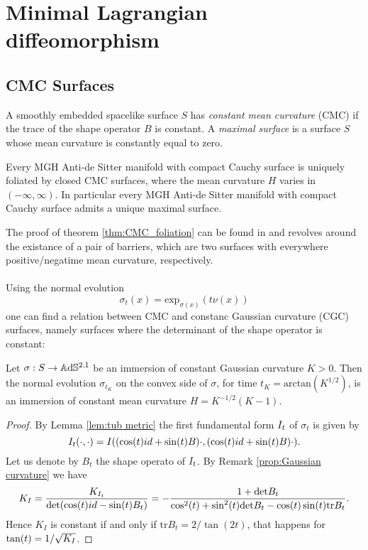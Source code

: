 \chapter{Minimal Lagrangian diffeomorphism}



\section{CMC Surfaces}
A smoothly embedded spacelike surface $S$ has \textit{constant mean curvature} (CMC) if the trace of the shape operator $B$ is constant. A \textit{maximal surface} is a surface $S$ whose mean curvature is constantly equal to zero.
\begin{theorem}\label{thm:CMC_foliation}
    Every MGH Anti-de Sitter manifold with compact Cauchy surface is uniquely foliated by closed CMC surfaces, where the mean curvature $H$ varies in $(-\infty,\infty)$. In particular every MGH Anti-de Sitter manifold with compact Cauchy surface admits a unique maximal surface.
\end{theorem}
The proof of theorem \ref{thm:CMC_foliation} can be found in \cite{barbot2004constant} and revolves around the existance of a pair of barriers, which are two surfaces with everywhere positive/negatime mean curvature, respectively.\\
\\
Using the normal evolution
\[
    \sigma_t(x) = \text{exp}_{\sigma(x)} (t\nu(x))
\]
one can find a relation between CMC and constanc Gaussian curvature (CGC) surfaces, namely surfaces where the determinant of the shape operator is constant:
\begin{proposition}
    Let $\sigma: S \to\mathbb{A}\mathrm{d}\mathbb{S}^{2,1}$ be an immersion of constant Gaussian curvature $K>0$. Then the normal evolution $\sigma_{t_K}$ on the convex side of $\sigma$, for time $t_K=\text{arctan}(K^{1/2})$, is an immersion of constant mean curvature $H=K^{-1/2}(K-1)$.
\end{proposition}
\begin{proof}
    By Lemma \ref{lem:tub metric} the first fundamental form $I_t$ of $\sigma_t$ is given by
    \[
        I_t(\cdot, \cdot) = I((\cos(t)id + \sin(t)B)\cdot, (\cos(t)id + \sin(t)B)\cdot).
    \]
    Let us denote by $B_t$ the shape operato of $I_t$. By Remark \ref{prop:Gaussian curvature} we have
    \[
        K_I = \frac{K_{I_t}}{\text{det}(\cos(t)id - \sin(t)B_t)} = - \frac{1+\text{det}B_t}{\cos^2(t) + \sin^2(t)\text{det} B_t -\cos(t) \sin(t)\text{tr} B_t}.
    \]
    Hence $K_I$ is constant if and only if $\text{tr} B_t = 2/ \tan(2t)$, that happens for $\tan(t) = 1 / \sqrt{K_I}$.
\end{proof}

